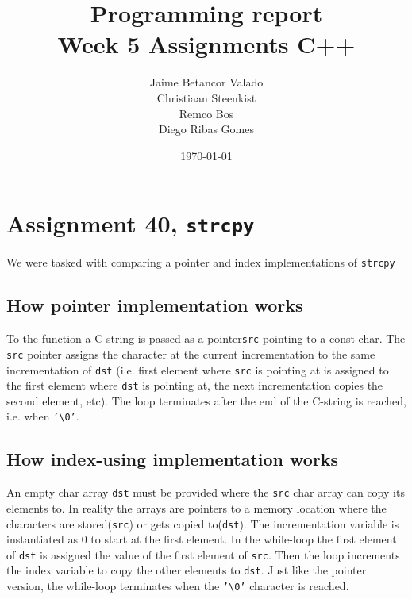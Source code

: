 \documentclass[11pt]{article}
\begin{document}
\title{Programming report \\
       Week 5 Assignments C++
}
\date{\today}
\author{Jaime Betancor Valado \\
Christiaan Steenkist \\
Remco Bos \\
Diego Ribas Gomes
}

\maketitle

\section*{Assignment 40, \texttt{strcpy}}
We were tasked with comparing a pointer and index implementations of \texttt{strcpy}

\subsection*{How pointer implementation works}
To the function a C-string is passed as a pointer\texttt{src} pointing to a const char.
The \texttt{src} pointer assigns the character at the current incrementation to the same
incrementation of \texttt{dst} (i.e. first element where \texttt{src} is pointing at is assigned to the first element
where \texttt{dst} is pointing at, the next incrementation copies the second element, etc).
The loop terminates after the end of the C-string is reached, i.e. when \texttt{'\textbackslash0'}.

\subsection*{How index-using implementation works}
An empty char array \texttt{dst} must be provided where the \texttt{src} char array can copy its elements to.
In reality the arrays are pointers to a memory location where the characters are stored(\texttt{src}) or gets copied to(\texttt{dst}).
The incrementation variable is instantiated as 0 to start at the first element. In the while-loop the first element
of \texttt{dst} is assigned the value of the first element of \texttt{src}. Then the loop increments the index variable to copy the other
elements to \texttt{dst}. Just like the pointer version, the while-loop terminates when the \texttt{'\textbackslash0'} character is reached.
\end{document}
